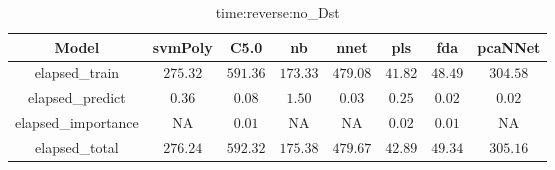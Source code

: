 \begin{table}[!ht]
	\centering
	\begin{tabular}{|c|c|c|c|c|c|c|c|}
		\hline
		Model & svmPoly & C5.0 & nb & nnet & pls & fda & pcaNNet \\ \hline
		elapsed_train & $275.32$ & $591.36$ & $173.33$ & $479.08$ & $41.82$ & $48.49$ & $304.58$ \\ \hline
		elapsed_predict & $0.36$ & $0.08$ & $1.50$ & $0.03$ & $0.25$ & $0.02$ & $0.02$ \\ \hline
		elapsed_importance & NA & $0.01$ & NA & NA & $0.02$ & $0.01$ & NA \\ \hline
		elapsed_total & $276.24$ & $592.32$ & $175.38$ & $479.67$ & $42.89$ & $49.34$ & $305.16$ \\ \hline
	\end{tabular}
	\caption{time:reverse:no_Dst}
	\label{tab:time:reverse:no_Dst}
\end{table}
